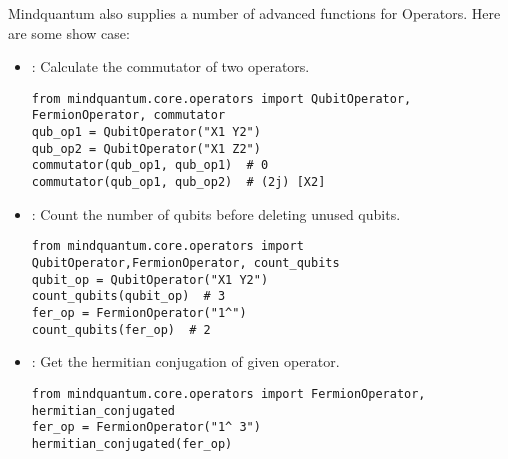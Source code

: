 Mindquantum also supplies a number of advanced functions for Operators. Here are some show case:
\begin{itemize}
    \item {} : Calculate the commutator of two operators.
          \begin{lstlisting}
from mindquantum.core.operators import QubitOperator, FermionOperator, commutator
qub_op1 = QubitOperator("X1 Y2")
qub_op2 = QubitOperator("X1 Z2")
commutator(qub_op1, qub_op1)  # 0
commutator(qub_op1, qub_op2)  # (2j) [X2]
    \end{lstlisting}
    \item {} : Count the number of qubits before deleting unused qubits.
          \begin{lstlisting}
from mindquantum.core.operators import QubitOperator,FermionOperator, count_qubits
qubit_op = QubitOperator("X1 Y2")
count_qubits(qubit_op)  # 3
fer_op = FermionOperator("1^")
count_qubits(fer_op)  # 2
    \end{lstlisting}
    \item {} : Get the hermitian conjugation of given operator.
          \begin{lstlisting}
from mindquantum.core.operators import FermionOperator, hermitian_conjugated
fer_op = FermionOperator("1^ 3")
hermitian_conjugated(fer_op)
    \end{lstlisting}
\end{itemize}

